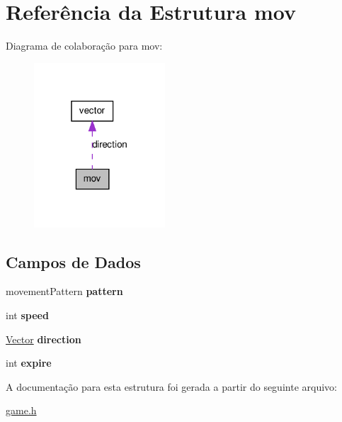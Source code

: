 \hypertarget{structmov}{
\section{Referência da Estrutura mov}
\label{structmov}
}


Diagrama de colaboração para mov:\nopagebreak
\begin{figure}[H]
\begin{center}
\leavevmode
\includegraphics[width=139pt]{structmov__coll__graph}
\end{center}
\end{figure}
\subsection*{Campos de Dados}
\begin{DoxyCompactItemize}
\item 
\hypertarget{structmov_aecb8547c3f519debb1e12fcf4629d05c}{
movementPattern {\bfseries pattern}}
\label{structmov_aecb8547c3f519debb1e12fcf4629d05c}

\item 
\hypertarget{structmov_a218b4f7c6cc2681a99c23a3b089d68b1}{
int {\bfseries speed}}
\label{structmov_a218b4f7c6cc2681a99c23a3b089d68b1}

\item 
\hypertarget{structmov_a2db09f9fefd93b32aad2f340ad270622}{
\hyperlink{structvector}{Vector} {\bfseries direction}}
\label{structmov_a2db09f9fefd93b32aad2f340ad270622}

\item 
\hypertarget{structmov_a2f16194304829daa3f050ba49f218b5f}{
int {\bfseries expire}}
\label{structmov_a2f16194304829daa3f050ba49f218b5f}

\end{DoxyCompactItemize}


A documentação para esta estrutura foi gerada a partir do seguinte arquivo:\begin{DoxyCompactItemize}
\item 
\hyperlink{game_8h}{game.h}\end{DoxyCompactItemize}
